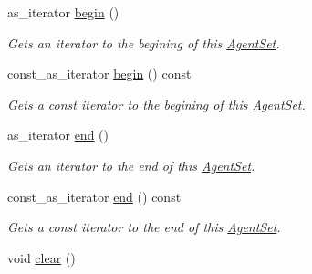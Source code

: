 \begin{DoxyCompactItemize}
as\-\_\-iterator \hyperlink{classrepast_1_1relogo_1_1_agent_set_a9492708e0f156e29fcfa77f9477887af}{begin} ()
\begin{DoxyCompactList}\small\item\em Gets an iterator to the begining of this \hyperlink{classrepast_1_1relogo_1_1_agent_set}{Agent\-Set}. \end{DoxyCompactList}\item 
const\-\_\-as\-\_\-iterator \hyperlink{classrepast_1_1relogo_1_1_agent_set_a209b06bdddbcf48eebc316c7784c226c}{begin} () const 
\begin{DoxyCompactList}\small\item\em Gets a const iterator to the begining of this \hyperlink{classrepast_1_1relogo_1_1_agent_set}{Agent\-Set}. \end{DoxyCompactList}\item 
as\-\_\-iterator \hyperlink{classrepast_1_1relogo_1_1_agent_set_ab862376938b785f091c0b0720de759f3}{end} ()
\begin{DoxyCompactList}\small\item\em Gets an iterator to the end of this \hyperlink{classrepast_1_1relogo_1_1_agent_set}{Agent\-Set}. \end{DoxyCompactList}\item 
const\-\_\-as\-\_\-iterator \hyperlink{classrepast_1_1relogo_1_1_agent_set_a9b48798c03c4a1f39d63af9a0efefc96}{end} () const 
\begin{DoxyCompactList}\small\item\em Gets a const iterator to the end of this \hyperlink{classrepast_1_1relogo_1_1_agent_set}{Agent\-Set}. \end{DoxyCompactList}\item 
\hypertarget{classrepast_1_1relogo_1_1_agent_set_aad1e6bd07bd986979044c1097464de19}{void \hyperlink{classrepast_1_1relogo_1_1_agent_set_aad1e6bd07bd986979044c1097464de19}{clear} ()}\label{classrepast_1_1relogo_1_1_agent_set_aad1e6bd07bd986979044c1097464de19}


\end{DoxyCompactItemize}
